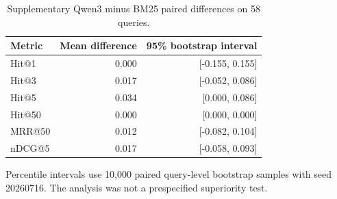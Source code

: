 \begin{table}[t]
\centering
\begin{threeparttable}
\caption{Supplementary Qwen3 minus BM25 paired differences on 58 queries.}
\label{tab:qwen_delta}
\begin{tabular}{lrr}
\toprule
Metric & Mean difference & 95\% bootstrap interval \\
\midrule
Hit@1 & 0.000 & [-0.155, 0.155] \\
Hit@3 & 0.017 & [-0.052, 0.086] \\
Hit@5 & 0.034 & [0.000, 0.086] \\
Hit@50 & 0.000 & [0.000, 0.000] \\
MRR@50 & 0.012 & [-0.082, 0.104] \\
nDCG@5 & 0.017 & [-0.058, 0.093] \\
\bottomrule
\end{tabular}
\begin{tablenotes}[flushleft]\footnotesize
\item Percentile intervals use 10,000 paired query-level bootstrap samples with seed 20260716. The analysis was not a prespecified superiority test.
\end{tablenotes}
\end{threeparttable}
\end{table}
